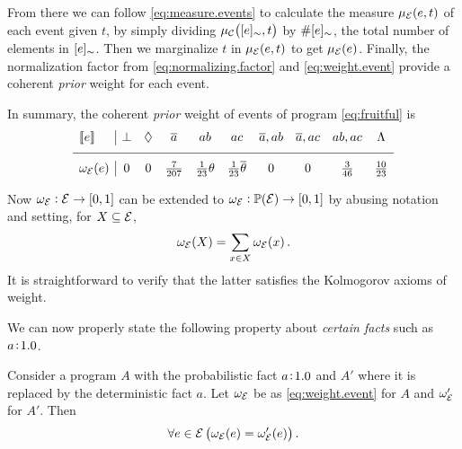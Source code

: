 \documentclass[x11names]{tlp}
\begin{document}
\begin{example}
		From there we can follow \cref{eq:measure.events} to calculate the measure
		$\pwe{e, t}$ of each event given $t$, by simply dividing $\pwc{\class{e}, t}$
		by $\#[{e}]_{\sim}$, the total number of elements in $[{e}]_{\sim}$.
Then we
		marginalize $t$ in $\pwe{e, t}$ to get $\pwe{e}$.
Finally, the normalization
		factor from \cref{eq:normalizing.factor} and \cref{eq:weight.event}
		provide a coherent \emph{prior} weight for each event.

		In summary, the coherent \emph{prior} weight of events of program
		\cref{eq:fruitful} is
		\begin{equation}
			\begin{array}{l|ccccccccc}
				\stablecore{e}          &
				\inconsistent           &
				\indepclass             &
				\co{a}                  &
				ab                      &
				ac                      &
				\co{a}, ab              &
				\co{a}, ac              &
				ab, ac                  &
				\consequenceclass
				\\ \hline
				\wgtE\at{e}              &
				0                       &
				0                       &
				\frac{7}{207}           &
				\frac{1}{23}\theta      &
				\frac{1}{23}\co{\theta} &
				0                       &
				0                       &
				\frac{3}{46}            &
				\frac{10}{23}
			\end{array}
		\end{equation}
		\label{eq:sbf.prior}

	\end{example}
\fi

Now $\wgtE:\EVENTSset \to \intcc{0,1}$ can be extended to
$\wgtE:\powerset{\EVENTSset}\to\intcc{0,1}$ by abusing notation and setting, for $X \subseteq \EVENTSset$,
\begin{equation}
	\wgtE\at{X} = \sum_{x\in X}\wgtE\at{x}.
	\label{eq:prob.event.set}
\end{equation}
It is straightforward to verify that the latter satisfies the Kolmogorov axioms of weight.

We can now properly state the following property about \emph{certain facts}
such as $a\!:\!1.0$.
\begin{proposition}
	\label{prop:prob.one}

	Consider a program $A$ with the probabilistic fact $a\!:\!1.0$ and
	$A'$ where it is replaced by the deterministic fact $a$.
Let $\wgtE$ be as
	\cref{eq:weight.event} for $A$ and $\wgtfunc'_{\EVENTSset}$ for $A'$.
	Then
	\begin{equation}
		\forall e \in \EVENTSset \left(\wgtE\at{e} = \wgtfunc'_{\EVENTSset}\at{e}\right).
	\end{equation}
\end{proposition}
\end{document}
